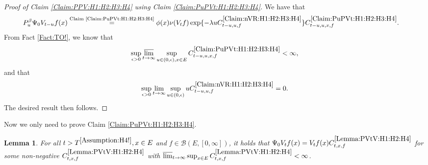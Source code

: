 \documentclass[12pt,a4paper]{amsart}
\numberwithin{equation}{section}
\theoremstyle{plain}
\newtheorem{lem}[thm]{Lemma}
\theoremstyle{definition}
\theoremstyle{remark}
\newcounter{N}
\newcounter{n}[N]
\begin{document}
\begin{proof}[{Proof of Claim \ref{Claim:PPV:H1:H2:H3:H4} using Claim \ref{Claim:PuPVt:H1:H2:H3:H4}}]
We have that
\begin{align}
 & P_u^\beta \Psi_0 V_{t-u} f(x)
 \overset{\text{Claim \ref{Claim:PuPVt:H1:H2:H3:H4}}}= \phi(x) \nu(V_{t}f) \exp\{-\lambda u C^{\ref{Claim:nVR:H1:H2:H3:H4}}_{t-u,u,f} \} C^{\ref{Claim:PuPVt:H1:H2:H3:H4}}_{t-u,u,x,f}.
 \end{align}
From Fact \ref{Fact:TO!}, we know that
\[\sup_{\epsilon > 0}\varlimsup_{t\to \infty} \sup_{u\in (0,\epsilon), x\in E} C^{\ref{Claim:PuPVt:H1:H2:H3:H4}}_{t-u,u,x,f} < \infty,\]
and that
\[\sup_{\epsilon > 0}\lim_{t\to \infty} \sup_{u\in (0,\epsilon)} uC^{\ref{Claim:nVR:H1:H2:H3:H4}}_{t-u,u,f} =0.\]
The desired result then follows.
\end{proof}
Now we only need to prove Claim \ref{Claim:PuPVt:H1:H2:H3:H4}.
\begin{lem} \label{Lemma:PVtV:H1:H2:H4}
For all $t> T^{\ref{Assumption:H4!}}, x\in E$ and $f\in \mathcal B(E,[0,\infty])$, it holds that
$
 \Psi_0 V_t f(x)
 = V_tf(x) C^{\ref{Lemma:PVtV:H1:H2:H4}}_{t,x,f}
$
 for some non-negative $C^{\ref{Lemma:PVtV:H1:H2:H4}}_{t,x,f}$ with $\varlimsup_{t\to \infty} \sup_{x\in E}C^{\ref{Lemma:PVtV:H1:H2:H4}}_{t,x,f} < \infty$.
\end{lem}
\end{document}

